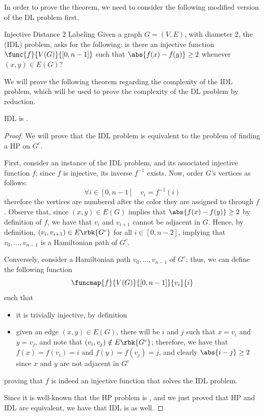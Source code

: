\documentclass[a4paper, 12pt]{report}
\begin{document}
    In order to prove the theorem, we need to consider the following modified version of the DL problem first.

    \begin{frameddefn}{Injective Distance 2 Labeling}
        Given a graph $G = (V, E)$, with diameter 2, the  (IDL) problem, asks for the following: is there an injective function $\func{f}{V(G)}{[0, n - 1]}$ such that $\abs{f(x)- f(y)} \ge 2$ whenever $(x, y) \in E(G)$?
    \end{frameddefn}

    We will prove the following theorem regarding the complexity of the IDL problem, which will be used to prove the complexity of the DL problem by reduction.

    \begin{framedthm}{}
        IDL is \NPComplete.
    \end{framedthm}

    \begin{proof}
        We will prove that the IDL problem is equivalent to the problem of finding a HP on $G^c$.

        First, consider an instance of the IDL problem, and its associated injective function $f$; since $f$ is injective, its inverse $f^{-1}$ exists. Now, order $G$'s vertices as follows: $$\forall i \in [0, n - 1] \quad v_i = f^{-1}(i)$$ therefore the vertices are numbered after the color they are assigned to through $f$. Observe that, since $(x, y) \in E(G)$ implies that $\abs{f(x) - f(y)} \ge 2$ by definition of $f$, we have that $v_i$ and $v_{i + 1}$ cannot be adjacent in $G$. Hence, by definition, $(v_i, v_{i + 1}) \in E\rbk{G^c}$ for all $i \in [0, n - 2]$, implying that $v_0 , \ldots, v_{n - 1}$ is a Hamiltonian path of $G^c$.

        Conversely, consider a Hamiltonian path $v_0, \ldots, v_{n - 1}$ of $G^c$; thus, we can define the following function $$\funcmap{f}{V(G)}{[0, n - 1]}{v_i}{i}$$ such that

        \begin{itemize}
            \item it is trivially injective, by definition
            \item given an edge $(x, y) \in E(G)$, there will be $i$ and $j$ such that $x = v_i$ and $y = v_j$, and note that $(v_i, v_j) \notin E\rbk{G^c}$; therefore, we have that $f(x) = f(v_i) = i$ and $f(y) = f(v_j) = j$, and clearly $\abs{i - j} \ge 2$ since $x$ and $y$ are not adjacent in $G^c$
        \end{itemize}
        
        proving that $f$ is indeed an injective function that solves the IDL problem.

        Since it is well-known that the HP problem is \NPComplete, and we just proved that HP and IDL are equivalent, we have that IDL is \NPComplete as well.
    \end{proof}
\end{document}
